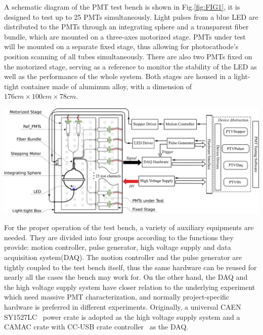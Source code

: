 \documentclass[a4paper,10pt,twoside]{cpc-hepnp}
\begin{document}
\begin{CJK*}{UTF8}{gbsn}
\begin{multicols}{2}
A schematic diagram of the PMT test bench is shown in Fig.\ref{fig:FIG1}, it is designed to test up to 25 PMTs simultaneously.
Light pulses from a blue LED are distributed to the PMTs through an integrating sphere and a transparent fiber bundle, which are mounted on a three-axes motorized stage.
PMTs under test will be mounted on a separate fixed stage, thus allowing for photocathode's position scanning of all tubes simultaneously.
There are also two PMTs fixed on the motorized stage, serving as a reference to monitor the stability of the LED as well as the performance of the whole system.
Both stages are housed in a light-tight container made of aluminum alloy, with a dimension of $176cm\times100cm\times78cm$.

\end{multicols}
\begin{center}
	\includegraphics[width=140mm]{FIG1}
\end{center}
\begin{multicols}{2}
	
For the proper operation of the test bench, a variety of auxiliary equipments are needed. 
They are divided into four groups according to the functions they provide: motion controller, pulse generator, high voltage supply and data acquisition system(DAQ).
The motion controller and the pulse generator are tightly coupled to the test bench itself, thus the same hardware can be reused for nearly all the cases the bench may work for.
On the other hand, the DAQ and the high voltage supply system have closer relation to the underlying experiment which need massive PMT characterization, and normally project-specific hardware is preferred in different experiments. 
Originally, a universal CAEN SY1527LC~\citep{sy1527lc} power crate is adopted as the high voltage supply system and a CAMAC crate with CC-USB crate controller~\citep{cc_usb} as the DAQ.


\end{multicols}
\end{CJK*}
\end{document}
